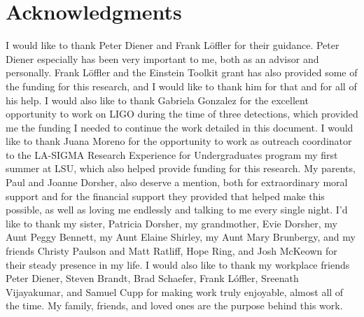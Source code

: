\documentclass[12pt,letterpaper]{lsuetd}
\begin{document}

\chapter*{Acknowledgments}
\doublespacing
\vspace{0.55ex}
I would like to thank Peter Diener and Frank L\"{o}ffler for their guidance. Peter Diener especially has been very important to me, both as an advisor and personally. Frank L\"{o}ffler and the Einstein Toolkit grant has also provided some of the funding for this research, and I would like to thank him for that and for all of his help. I would also like to thank Gabriela Gonzalez for the excellent opportunity to work on LIGO during the time of three detections, which provided me the funding I needed to continue the work detailed in this document. I would like to thank Juana Moreno for the opportunity to work as outreach coordinator to the LA-SIGMA Research Experience for Undergraduates program my first summer at LSU, which also helped provide funding for this research. My parents, Paul and Joanne Dorsher, also deserve a mention, both for extraordinary moral support and for the financial support they provided that helped make this possible, as well as loving me endlessly and talking to me every single night. I'd like to thank my sister, Patricia Dorsher, my grandmother, Evie Dorsher, my Aunt Peggy Bennett, my Aunt Elaine Shirley, my Aunt Mary Brunbergy, and my friends Christy Paulson and Matt Ratliff, Hope Ring, and Josh McKeown for their steady presence in my life. I would also like to thank my workplace friends Peter Diener, Steven Brandt, Brad Schaefer, Frank L\'{o}ffler, Sreenath Vijayakumar, and Samuel Cupp for making work truly enjoyable, almost all of the time. My family, friends, and loved ones are the purpose behind this work. 

\pagebreak
\end{document}
